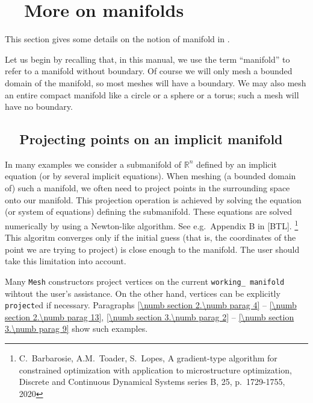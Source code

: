 
\chapter{~~More on manifolds}\label{\numb section 8}

This section gives some details on the notion of manifold in \maniFEM.

Let us begin by recalling that, in this manual, we use the term ``manifold'' to refer to
a manifold without boundary.
Of course we will only mesh a bounded domain of the manifold, so most meshes will have a boundary.
We may also mesh an entire compact manifold like a circle or a sphere or a torus;
such a mesh will have no boundary.


\section{~~Projecting points on an implicit manifold}\label{\numb section 8.\numb parag 1}

In many examples we consider a submanifold of $ \mathbb{R}^n $ defined by an implicit equation
(or by several implicit equations).
When meshing (a bounded domain of) such a manifold, we often need to project points in
the surrounding space onto our manifold. This projection operation is achieved by solving
the equation (or system of equations) defining the submanifold.
These equations are solved numerically by using a Newton-like algorithm.
See e.g.\ Appendix B in [BTL].%
\footnote{C.~Barbarosie, A.M.~Toader, S.~Lopes, A gradient-type algorithm for constrained
optimization with application to microstructure optimization, Discrete and Continuous Dynamical
Systems series B, 25, p.\ 1729-1755, 2020}
This algoritm converges only if the initial guess (that is, the coordinates of the point we are
trying to project) is close enough to the manifold.
The user should take this limitation into account.

Many {\small\tt Mesh} constructors project vertices on the current {\small\tt working\_\,manifold}
wihtout the user's assistance.
On the other hand, vertices can be explicitly {\small\tt project}ed if necessary.
Paragraphs \ref{\numb section 2.\numb parag 4} -- \ref{\numb section 2.\numb parag 13},
\ref{\numb section 3.\numb parag 2} -- \ref{\numb section 3.\numb parag 9} show such examples.
